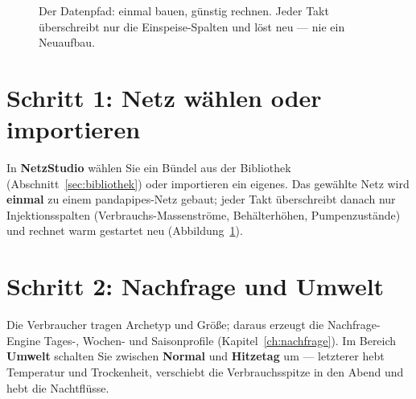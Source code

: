 \documentclass[11pt,a4paper,parskip=half]{scrreprt}
\newcommand{\ui}[1]{\textsf{\bfseries #1}}      %
\begin{document}
\begin{figure}[t]
\centering
{}
\caption{Der Datenpfad: einmal bauen, günstig rechnen. Jeder Takt überschreibt
nur die Einspeise-Spalten und löst neu — nie ein Neuaufbau.}
\label{fig:datenpfad}
\end{figure}

\section{Schritt 1: Netz wählen oder importieren}

In \ui{NetzStudio} wählen Sie ein Bündel aus der Bibliothek
(Abschnitt~\ref{sec:bibliothek}) oder importieren ein eigenes. Das gewählte Netz
wird \textbf{einmal} zu einem pandapipes-Netz gebaut; jeder Takt überschreibt
danach nur Injektionsspalten (Verbrauchs-Massenströme, Behälterhöhen,
Pumpenzustände) und rechnet warm gestartet neu (Abbildung~\ref{fig:datenpfad}).

\section{Schritt 2: Nachfrage und Umwelt}

Die Verbraucher tragen Archetyp und Größe; daraus erzeugt die Nachfrage-Engine
Tages-, Wochen- und Saisonprofile (Kapitel~\ref{ch:nachfrage}). Im Bereich
\ui{Umwelt} schalten Sie zwischen \ui{Normal} und \ui{Hitzetag} um — letzterer
hebt Temperatur und Trockenheit, verschiebt die Verbrauchsspitze in den Abend und
hebt die Nachtflüsse.
\end{document}
